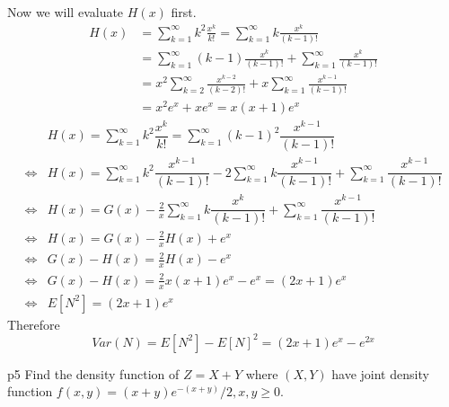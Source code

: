 \documentclass[a4paper, 11pt]{article}
\begin{document}
{Now we will evaluate $H(x)$ first. \begin{align*}
	H(x) & = \sum_{k=1}^{\infty}k^2\frac{x^k}{k!}= \sum_{k=1}^{\infty}k\frac{x^k}{(k-1)!}           \\
	     & =\sum_{k=1}^{\infty}(k-1)\frac{x^{k}}{(k-1)!}+\sum_{k=1}^{\infty}\frac{x^{k}}{(k-1)!}    \\
	     & =x^2\sum_{k=2}^{\infty}\frac{x^{k-2}}{(k-2)!}+x\sum_{k=1}^{\infty}\frac{x^{k-1}}{(k-1)!} \\
	     & =x^2e^x+xe^x=x(x+1)e^x
\end{align*}\begin{align*}
	     & H(x)=\sum\limits_{k=1}^{\infty}k^2\dfrac{x^k}{k!}=\sum\limits_{k=1}^{\infty}(k-1)^2\dfrac{x^{k-1}}{(k-1)!}                                                      \\
	\iff & H(x)=\sum\limits_{k=1}^{\infty}k^2\dfrac{x^{k-1}}{(k-1)!}-2\sum\limits_{k=1}^{\infty}k\dfrac{x^{k-1}}{(k-1)!}+\sum\limits_{k=1}^{\infty}\dfrac{x^{k-1}}{(k-1)!} \\
	\iff & H(x)=G(x)-\frac2x\sum\limits_{k=1}^{\infty}k\dfrac{x^{k}}{(k-1)!}+\sum\limits_{k=1}^{\infty}\dfrac{x^{k-1}}{(k-1)!}                                             \\
	\iff & H(x)=G(x)-\frac2xH(x)+e^x                                                                                                                                       \\
	\iff & G(x)-H(x)=\frac2xH(x)-e^x                                                                                                                                       \\
	\iff & G(x)-H(x)=\frac{2}{x}x(x+1)e^x-e^x=(2x+1)e^x                                                                                                                    \\
	\iff & E[N^2]=(2x+1)e^x
\end{align*}Therefore$$Var(N)=E[N^2]-E[N]^2=(2x+1)e^x-e^{2x}$$
}



\begin{problem}{%
}{p5%
}
Find the density function of $Z=X+Y$ where $(X, Y)$ have joint density function $f(x, y)=(x+y) e^{-(x+y)} / 2, x, y \geq 0 .$
\end{problem}
\end{document}
